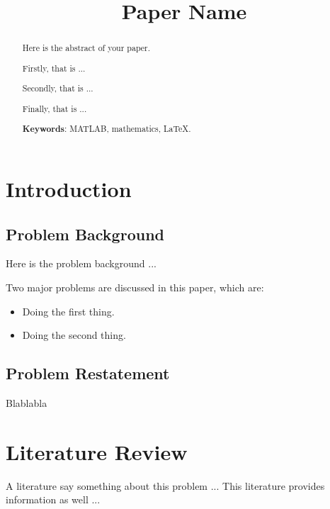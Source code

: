 \documentclass[12pt]{article}
\title{Paper Name}  %
\begin{document}
\begin{abstract}
    Here is the abstract of your paper.

    Firstly, that is ...

    Secondly, that is ...

    Finally, that is ...

    \vspace{5pt}
    \textbf{Keywords}: MATLAB, mathematics, LaTeX.

\end{abstract}

\maketitle
\tableofcontents





\section{Introduction}

\subsection{Problem Background}

	Here is the problem background ...
	
	
	
	Two major problems are discussed in this paper, which are:
	\begin{itemize}
	    \item Doing the first thing.
	    \item Doing the second thing.
	\end{itemize}

\subsection{Problem Restatement}

	Blablabla
	
	
	


\section{Literature Review}

	A literature \autocite{1} say something about this problem ...  This literature \autocite{2} provides information as well ...
\end{document}
